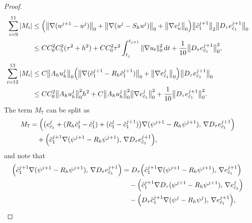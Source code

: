 \begin{proof}
\begin{align}
  \sum_{i=9}^{11}|M_{i}|
  &\leq \Bigl(\bigl\|\nabla(u^{j+1}-u^{j})\bigr\|_{0}
             + \bigl\|\nabla(u^{j} - S_{h}u^{j})\bigr\|_{0}
             + \bigl\|\nabla e_{u}^{j}\bigr\|_{0}\Bigr)
    \bigl\|\tilde{c}_{1}^{j+1}\bigr\|_{2}
    \bigl\|D_{\tau}e_{\tilde{c}_{1}}^{j+1}\bigr\|_{0}
  \nonumber\\
  &\leq CC_{0}^{2}C_{5}^{2}(\tau^{2}+h^{2})
     + CC_{0}^{2}\tau^{2}\int_{t_{j}}^{t_{j+1}}\|\nabla u_{t}\|_{0}^{2}\,\mathrm{d}t
     + \frac{1}{10}\bigl\|D_{\tau}e_{\tilde{c}_{1}}^{j+1}\bigr\|_{0}^{2},
  \label{eq:M9-11}\\[4pt]
  \sum_{i=12}^{13}|M_{i}|
  &\leq C\bigl\|A_{h}u_{h}^{j}\bigr\|_{0}
    \Bigl(\bigl\|\nabla(\tilde{c}_{1}^{j+1} - R_{h}\tilde{c}_{1}^{j+1})\bigr\|_{0}
         + \bigl\|\nabla e_{\tilde{c}_{1}}^{j}\bigr\|_{0}\Bigr)
    \bigl\|D_{\tau}e_{\tilde{c}_{1}}^{j+1}\bigr\|_{0}
  \nonumber\\
  &\leq CC_{0}^{2}\bigl\|A_{h}u_{h}^{j}\bigr\|_{0}^{2}h^{2}
     + C\bigl\|A_{h}u_{h}^{j}\bigr\|_{0}^{2}
       \bigl\|\nabla e_{\tilde{c}_{1}}^{j}\bigr\|_{0}^{2}
     + \frac{1}{10}\bigl\|D_{\tau}e_{\tilde{c}_{1}}^{j+1}\bigr\|_{0}^{2}.
  \label{eq:M12-13}
\end{align}
The term $M_{7}$ can be split as
\begin{align}
  M_{7}
  &= \Bigl(\bigl(e_{\tilde{c}_{1}}^{j}
                + (R_{h}\tilde{c}_{1}^{j} - \tilde{c}_{1}^{j})
                + (\tilde{c}_{1}^{j} - \tilde{c}_{1}^{j+1})\bigr)
           \nabla(\psi^{j+1} - R_{h}\psi^{j+1}),\,
           \nabla D_{\tau}e_{\tilde{c}_{1}}^{j+1}\Bigr)
  \nonumber\\
  &\quad + \Bigl(\tilde{c}_{1}^{j+1}\nabla(\psi^{j+1} - R_{h}\psi^{j+1}),\,
               \nabla D_{\tau}e_{\tilde{c}_{1}}^{j+1}\Bigr),
  \label{eq:M7-split}
\end{align}
and note that
\begin{align}
  \Bigl(\tilde{c}_{1}^{j+1}\nabla(\psi^{j+1} - R_{h}\psi^{j+1}),\,
        \nabla D_{\tau}e_{\tilde{c}_{1}}^{j+1}\Bigr)
  &= D_{\tau}\Bigl(\tilde{c}_{1}^{j+1}\nabla(\psi^{j+1} - R_{h}\psi^{j+1}),\,
                   \nabla e_{\tilde{c}_{1}}^{j+1}\Bigr)
  \nonumber\\
  &\quad - \Bigl(\tilde{c}_{1}^{j+1}\nabla D_{\tau}(\psi^{j+1} - R_{h}\psi^{j+1}),\,
               \nabla e_{\tilde{c}_{1}}^{j}\Bigr)
  \nonumber\\
  &\quad - \Bigl(D_{\tau}\tilde{c}_{1}^{j+1}\nabla(\psi^{j} - R_{h}\psi^{j}),\,
               \nabla e_{\tilde{c}_{1}}^{j+1}\Bigr),
  \label{eq:M7-tech}

\end{align}
\end{proof}
